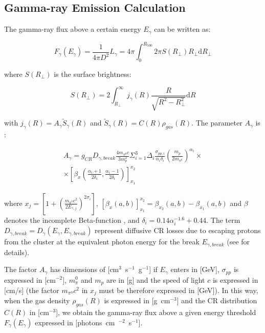 \documentclass[traditabstract]{aa}
\newcommand{\rmn}{\mathrm}
\begin{document}
\begin{appendix}
\section{Gamma-ray Emission Calculation}
\label{app:C}

The gamma-ray flux above a certain energy $E_{\gamma}$ can be written as:

\begin{equation}
F_{\gamma} (E_{\gamma}) = \frac{1}{4\pi D^{2}} L_{\gamma} = 4\pi \int_{0}^{R_{500}} 2\pi S(R_{\perp}) R_{\perp} \rmn{d}R_{\perp}
\end{equation}

where $S(R_{\perp})$ is the surface brightness:

\begin{equation}
S(R_{\perp}) = 2 \int_{R_{\perp}}^{\infty} j_{\gamma}(R) \frac{R}{\sqrt{R^{2}-R_{\perp}^{2}}} \rmn{d}R
\end{equation}

with $ j_{\gamma}(R)=A_{\gamma}\tilde{S}_{\gamma}(R)$ and $\tilde{S}_{\gamma}(R)  =  C(R) \rho_{gas}(R)$. The parameter $A_{\gamma}$ is \citep{2010MNRAS.409..449P}:

\begin{eqnarray}
A_{\gamma} = g_{CR} D_{\gamma,break} \frac{4 m_{\pi^{0}} c}{3 m_{p}^{2}} \Sigma_{i=1}^{3} \Delta_{i} \frac{\sigma_{pp,i}}{\alpha_{i} \delta_{i}} \left( \frac{m_{p}}{2 m_{\pi^{0}}} \right)^{\alpha_{i}} \times \nonumber \\
\times \left[ \beta_{x} \left( \frac{\alpha_{i}+1}{2\delta_{i}}, \frac{\alpha_{i}-1}{2\delta_{i}} \right) \right]_{x_{1}}^{x_{2}} 
\end{eqnarray}

where $x_{j}=\left[ 1 + \left( \frac{m_{\pi^{0}}c^2}{2E_{\gamma,j}} \right)^{2\sigma_{i}} \right]$, $\left[ \beta_{x}(a,b) \right]_{x_1}^{x_2} = \beta_{x_2}(a,b)-\beta_{x_1}(a,b)$ and $\beta$ denotes the incomplete Beta-function \citep{1965hmfw.book.....A}, and $\delta_{i}=0.14\alpha_{i}^{-1.6}+0.44$. The term $D_{\gamma, break}=D_{\gamma}(E_{\gamma},E_{\gamma,break})$ represent diffusive CR losses due to escaping protons from the cluster at the equivalent photon energy for the break $E_{\gamma, break}$ (see \citealp{2010MNRAS.409..449P} for details).

The factor $A_{\gamma}$ has dimensions of [cm$^3$~s$^{-1}$~g$^{-1}$] if $E_{\gamma}$ enters in [GeV], $\sigma_{pp}$ is expressed in [cm$^{-2}$], $m_{\pi}^{0}$ and $m_{p}$ are in [g] and the speed of light $c$ is expressed in [cm/s] (the factor $m_{\pi^{0}}c^2$ in $x_{j}$ must be therefore expressed in [GeV]). In this way, when the gas density $\rho_{gas}(R)$ is expressed in [g~cm$^{-3}$] and the CR distribution $C(R)$ in [cm$^{-3}$], we obtain the gamma-ray flux above a given energy threshold $F_{\gamma}(E_{\gamma})$ expressed in [photons~cm~$^{-2}$~s$^{-1}$].

\end{appendix}
\end{document}
